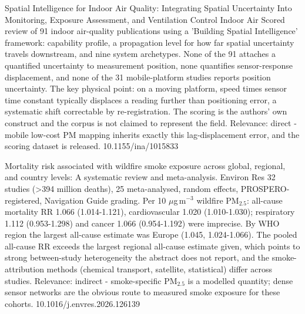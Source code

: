 \documentclass[10pt]{article}
\begin{document}
{Spatial Intelligence for Indoor Air Quality: Integrating Spatial Uncertainty Into Monitoring, Exposure Assessment, and Ventilation Control}
{Indoor Air}
{Scored review of 91 indoor air-quality publications using a 'Building Spatial Intelligence' framework: capability profile, a propagation level for how far spatial uncertainty travels downstream, and nine system archetypes. None of the 91 attaches a quantified uncertainty to measurement position, none quantifies sensor-response displacement, and none of the 31 mobile-platform studies reports position uncertainty. The key physical point: on a moving platform, speed times sensor time constant typically displaces a reading further than positioning error, a systematic shift correctable by re-registration. The scoring is the authors' own construct and the corpus is not claimed to represent the field. Relevance: direct - mobile low-cost PM mapping inherits exactly this lag-displacement error, and the scoring dataset is released.}
{10.1155/ina/1015833}

\par{}\baselineskip{}\baselineskip
{}

{Mortality risk associated with wildfire smoke exposure across global, regional, and country levels: A systematic review and meta-analysis.}
{Environ Res}
{32 studies (>394 million deaths), 25 meta-analysed, random effects, PROSPERO-registered, Navigation Guide grading. Per 10 $\mu$g\,m$^{-3}$ wildfire PM$_{2.5}$: all-cause mortality RR 1.066 (1.014-1.121), cardiovascular 1.020 (1.010-1.030); respiratory 1.112 (0.953-1.298) and cancer 1.066 (0.954-1.192) were imprecise. By WHO region the largest all-cause estimate was Europe (1.045, 1.024-1.066). The pooled all-cause RR exceeds the largest regional all-cause estimate given, which points to strong between-study heterogeneity the abstract does not report, and the smoke-attribution methods (chemical transport, satellite, statistical) differ across studies. Relevance: indirect - smoke-specific PM$_{2.5}$ is a modelled quantity; dense sensor networks are the obvious route to measured smoke exposure for these cohorts.}
{10.1016/j.envres.2026.126139}
\end{document}
